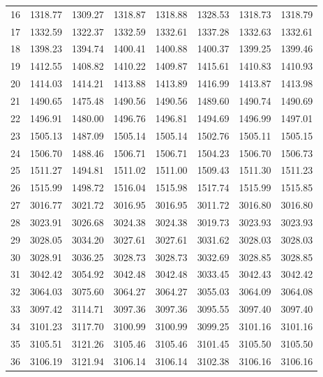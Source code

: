 \documentclass[10pt,oneside]{article}
\begin{document}
\begin{table}[h!]
\begin{tabular}{cccccccc}
16 &   1318.77 & 1309.27 & 1318.87 & 1318.88 &      1328.53 & 1318.73 & 1318.79 \\
17 &   1332.59 & 1322.37 & 1332.59 & 1332.61 &      1337.28 & 1332.63 & 1332.61 \\
18 &   1398.23 & 1394.74 & 1400.41 & 1400.88 &      1400.37 & 1399.25 & 1399.46 \\
19 &   1412.55 & 1408.82 & 1410.22 & 1409.87 &      1415.61 & 1410.83 & 1410.93 \\
20 &   1414.03 & 1414.21 & 1413.88 & 1413.89 &      1416.99 & 1413.87 & 1413.98 \\
21 &   1490.65 & 1475.48 & 1490.56 & 1490.56 &      1489.60 & 1490.74 & 1490.69 \\
22 &   1496.91 & 1480.00 & 1496.76 & 1496.81 &      1494.69 & 1496.99 & 1497.01 \\
23 &   1505.13 & 1487.09 & 1505.14 & 1505.14 &      1502.76 & 1505.11 & 1505.15 \\
24 &   1506.70 & 1488.46 & 1506.71 & 1506.71 &      1504.23 & 1506.70 & 1506.73 \\
25 &   1511.27 & 1494.81 & 1511.02 & 1511.00 &      1509.43 & 1511.30 & 1511.23 \\
26 &   1515.99 & 1498.72 & 1516.04 & 1515.98 &      1517.74 & 1515.99 & 1515.85 \\
27 &   3016.77 & 3021.72 & 3016.95 & 3016.95 &      3011.72 & 3016.80 & 3016.80 \\
28 &   3023.91 & 3026.68 & 3024.38 & 3024.38 &      3019.73 & 3023.93 & 3023.93 \\
29 &   3028.05 & 3034.20 & 3027.61 & 3027.61 &      3031.62 & 3028.03 & 3028.03 \\
30 &   3028.91 & 3036.25 & 3028.73 & 3028.73 &      3032.69 & 3028.85 & 3028.85 \\
31 &   3042.42 & 3054.92 & 3042.48 & 3042.48 &      3033.45 & 3042.43 & 3042.42 \\
32 &   3064.03 & 3075.60 & 3064.27 & 3064.27 &      3055.03 & 3064.09 & 3064.08 \\
33 &   3097.42 & 3114.71 & 3097.36 & 3097.36 &      3095.55 & 3097.40 & 3097.40 \\
34 &   3101.23 & 3117.70 & 3100.99 & 3100.99 &      3099.25 & 3101.16 & 3101.16 \\
35 &   3105.51 & 3121.26 & 3105.46 & 3105.46 &      3101.45 & 3105.50 & 3105.50 \\
36 &   3106.19 & 3121.94 & 3106.14 & 3106.14 &      3102.38 & 3106.16 & 3106.16 \\
\bottomrule
\end{tabular}
\end{table}
\end{document}
